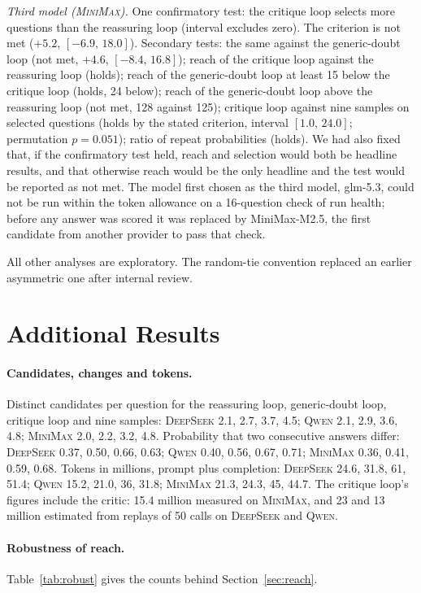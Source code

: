 \documentclass[11pt]{article}
\newcommand{\ds}{\textsc{DeepSeek}}
\newcommand{\qw}{\textsc{Qwen}}
\newcommand{\mm}{\textsc{MiniMax}}
\newcommand{\ci}[2]{$[#1,\,#2]$}
\begin{document}
\emph{Third model (\mm).}
One confirmatory test: the critique loop selects more questions than the reassuring loop (interval excludes zero).
The criterion is not met ($+5.2$, \ci{-6.9}{18.0}).
Secondary tests: the same against the generic-doubt loop (not met, $+4.6$, \ci{-8.4}{16.8}); reach of the critique loop against the reassuring loop (holds); reach of the generic-doubt loop at least 15 below the critique loop (holds, 24 below); reach of the generic-doubt loop above the reassuring loop (not met, 128 against 125); critique loop against nine samples on selected questions (holds by the stated criterion, interval \ci{1.0}{24.0}; permutation $p=0.051$); ratio of repeat probabilities (holds).
We had also fixed that, if the confirmatory test held, reach and selection would both be headline results, and that otherwise reach would be the only headline and the test would be reported as not met.
The model first chosen as the third model, glm-5.3, could not be run within the token allowance on a 16-question check of run health; before any answer was scored it was replaced by MiniMax-M2.5, the first candidate from another provider to pass that check.

All other analyses are exploratory.
The random-tie convention replaced an earlier asymmetric one after internal review.

\section{Additional Results}
\label{app:more}

\paragraph{Candidates, changes and tokens.}
Distinct candidates per question for the reassuring loop, generic-doubt loop, critique loop and nine samples: \ds{} 2.1, 2.7, 3.7, 4.5; \qw{} 2.1, 2.9, 3.6, 4.8; \mm{} 2.0, 2.2, 3.2, 4.8.
Probability that two consecutive answers differ: \ds{} 0.37, 0.50, 0.66, 0.63; \qw{} 0.40, 0.56, 0.67, 0.71; \mm{} 0.36, 0.41, 0.59, 0.68.
Tokens in millions, prompt plus completion: \ds{} 24.6, 31.8, 61, 51.4; \qw{} 15.2, 21.0, 36, 31.8; \mm{} 21.3, 24.3, 45, 44.7.
The critique loop's figures include the critic: 15.4 million measured on \mm, and 23 and 13 million estimated from replays of 50 calls on \ds{} and \qw.

\paragraph{Robustness of reach.}
Table~\ref{tab:robust} gives the counts behind Section~\ref{sec:reach}.
\end{document}
